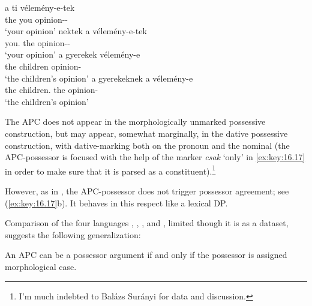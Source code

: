 \documentclass[output=paper]{langsci/langscibook}
\begin{document}
\ea\label{ex:key:16.16}
	\ea
		\gll a    ti    vélemény-e-tek\\
			the you opinion-\Poss-\Spl{}\\
		\glt    `your opinion'
	\ex
		\gll nektek    a    vélemény-e-tek\\
			you.\Dat{} the opinion-\Poss-\Spl{}\\
		\glt    `your opinion'
	\ex
		\gll a    gyerekek  vélemény-e\\
			the children  opinion-\Poss{}\\
		\glt    `the children's opinion'
	\ex
		\gll a    gyerekeknek    a    vélemény-e\\
			the children.\Dat{} the opinion-\Poss{}\\
		\glt    `the children's opinion'
	\z
\z

The \gls{APC} does not appear in the morphologically unmarked \Nom{} possessive
construction, but may appear, somewhat marginally, in the dative possessive
construction, with dative-marking both on the pronoun and the nominal (the
APC-possessor is focused with the help of the  marker \emph{csak} ‘only’
in \eqref{ex:key:16.17} in order to make sure that it is parsed as a constituent).\footnote{
I’m much indebted to Balázs Surányi for data and discussion.}

\ea\label{ex:key:16.17}
	\z
\z

However, as in , the APC-possessor does not trigger possessor agreement;
see (\ref{ex:key:16.17}b). It behaves in this respect like a lexical DP.

Comparison of the four languages , , , and ,
limited though it is as a dataset, suggests the following generalization:

\ea\label{ex:key:16.18}
    An \gls{APC} can be a possessor argument if and only if the possessor is
    assigned morphological case.
\z
\end{document}
